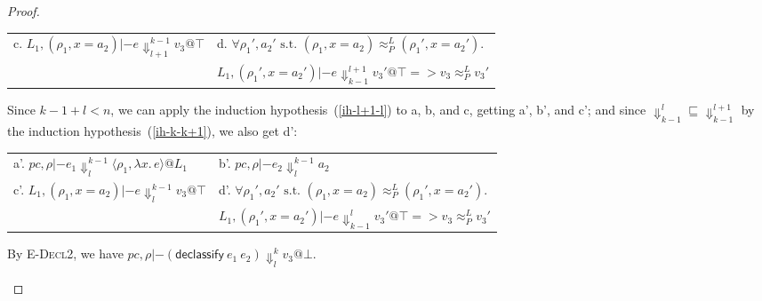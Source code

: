 \documentclass{article}
\makeatletter
\theoremstyle{definition}
\newcommand{\at}{\ensuremath{{\scriptstyle{@}}}}
\newcommand{\pc}{\ensuremath{{\mathit{pc}}}}
\makeatother
\begin{document}
\begin{proof}
\begin{enumerate}
\begin{itemize}
\begin{center}
\begin{tabular*}{1.0\linewidth}{ll}
            c.
            $L_1, (\rho_1, x = a_2) |- e
            \Downarrow^{k-1}_{l+1}
            v_3 \at \top$
            &
            d.
            $\forall{\rho_1', a_2' \text{ s.t. }
              (\rho_1, x = a_2) \approx^{L}_{P} (\rho_1', x = a_2')}.$
            \\ & \quad\quad
            $L_1, (\rho_1', x = a_2') |- e \Downarrow^{l+1}_{k-1} v_3' \at \top =>
            v_3 \approx^{L}_{P} v_3'$
          \end{tabular*}
        \end{center}
        Since $k-1 + l < n$, we can apply the induction
        hypothesis~(\ref{ih-l+1-l}) to a, b, and c, getting a', b', and c';
        and since $\Downarrow^{l}_{k-1} \sqsubseteq \Downarrow^{l+1}_{k-1}$
        by the induction hypothesis~(\ref{ih-k-k+1}), we also get d':
        \begin{center}
          \begin{tabular*}{1.0\linewidth}{ll}
            a'.
            $\pc, \rho |- e_1
            \Downarrow^{k-1}_{l}
            \langle{\rho_1, \lambda{x}.\, e\rangle} \at L_1$
            &
            b'.
            $\pc, \rho |- e_2
            \Downarrow^{k-1}_{l}
            a_2$
            \\[1.8ex]
            c'.
            $L_1, (\rho_1, x = a_2) |- e
            \Downarrow^{k-1}_{l}
            v_3 \at \top$
            &
            d'.
            $\forall{\rho_1', a_2' \text{ s.t. }
              (\rho_1, x = a_2) \approx^{L}_{P} (\rho_1', x = a_2')}.$
            \\ & \quad\quad
            $L_1, (\rho_1', x = a_2') |- e \Downarrow^{l}_{k-1} v_3' \at \top =>
            v_3 \approx^{L}_{P} v_3'$
          \end{tabular*}
        \end{center}
      By \textsc{E-Decl2}, we have
      $\pc, \rho |- (\mathsf{declassify}\ e_1\ e_2)
      \Downarrow^{k}_{l}
      v_3 \at \bot$.
      \qedhere
      \end{itemize}
    \end{enumerate}
\end{proof}
\end{document}

